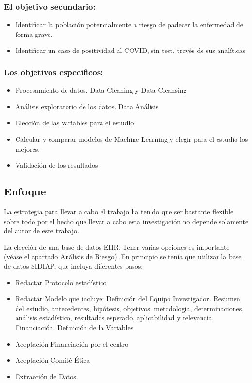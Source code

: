 \documentclass[
]{article}
\begin{document}
\hypertarget{el-objetivo-secundario}{%
\subsubsection{El objetivo secundario:}\label{el-objetivo-secundario}}

\begin{itemize}
\item
  Identificar la población potencialmente a riesgo de padecer la
  enfermedad de forma grave.
\item
  Identificar un caso de positividad al COVID, sin test, través de sus
  analíticas
\end{itemize}

\hypertarget{los-objetivos-especuxedficos}{%
\subsubsection{Los objetivos
específicos:}\label{los-objetivos-especuxedficos}}

\begin{itemize}
\item
  Procesamiento de datos. Data Cleaning y Data Cleansing
\item
  Análisis exploratorio de los datos. Data Análisis
\item
  Elección de las variables para el estudio
\item
  Calcular y comparar modelos de Machine Learning y elegir para el
  estudio los mejores.
\item
  Validación de los resultados
\end{itemize}

\hypertarget{enfoque}{%
\subsection{Enfoque}\label{enfoque}}

La estrategia para llevar a cabo el trabajo ha tenido que ser bastante
flexible sobre todo por el hecho que llevar a cabo esta investigación no
depende solamente del autor de este trabajo.

La elección de una base de datos EHR. Tener varias opciones es
importante (véase el apartado Análisis de Riesgo). En principio se tenía
que utilizar la base de datos SIDIAP, que incluya diferentes pasos:

\begin{itemize}
\item
  Redactar Protocolo estadístico
\item
  Redactar Modelo que incluye: Definición del Equipo Investigador.
  Resumen del estudio, antecedentes, hipótesis, objetivos, metodología,
  determinaciones, análisis estadístico, resultados esperado,
  aplicabilidad y relevancia. Financiación. Definición de la Variables.
\item
  Aceptación Financiación por el centro
\item
  Aceptación Comité Ética
\item
  Extracción de Datos.
\end{itemize}
\end{document}
